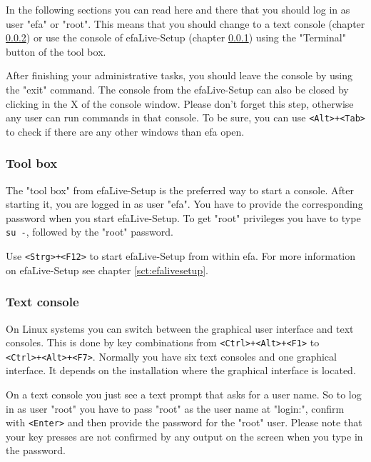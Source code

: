 \documentclass[a4paper,12pt,twoside]{article}
\begin{document}
In the following sections you can read here and there that you should
log in as user "efa" or
"root". This means that you should change
to a text console (chapter \ref{sct:text_console}) or use
the console of efaLive-Setup (chapter \ref{sct:toolbox})
using the "Terminal" button of the tool
box.

After finishing your administrative tasks, you should leave the console
by using the "exit" command. The console
from the efaLive-Setup can also be closed by clicking in the X of the
console window. Please don't forget this step,
otherwise any user can run commands in that console. To be sure, you
can use \texttt{{\textless}Alt{\textgreater}+{\textless}Tab{\textgreater}} to
check if there are any other windows than efa open.


\subsubsection{Tool box}
\label{sct:toolbox}
The "tool box" from efaLive-Setup is the preferred way to start a
console. After starting it, you are logged in as user
"efa". You have to provide the
corresponding password when you start efaLive-Setup. To get
"root" privileges you have to type
\texttt{su -}, followed by the
"root" password.

Use \texttt{{\textless}Strg{\textgreater}+{\textless}F12{\textgreater}} to start
efaLive-Setup from within efa. For more information on efaLive-Setup
see chapter \ref{sct:efalivesetup}.

\subsubsection{Text console}
\label{sct:text_console}
On Linux systems you can switch
between the graphical user interface and text consoles. This is done by
key combinations from
\texttt{{\textless}Ctrl{\textgreater}+{\textless}Alt{\textgreater}+{\textless}F1{\textgreater}} to\\
\texttt{{\textless}Ctrl{\textgreater}+{\textless}Alt{\textgreater}+{\textless}F7{\textgreater}}.
Normally you have six text consoles and one graphical interface. It
depends on the installation where the graphical interface is located.

On a text console you just see a text prompt that asks for a user name.
So to log in as user "root" you have to
pass "root" as the user name at
"login:", confirm with
\texttt{{\textless}Enter{\textgreater}} and then provide the password for the
"root" user. Please note that your key
presses are not confirmed by any output on the screen when you type in
the password.
\end{document}
